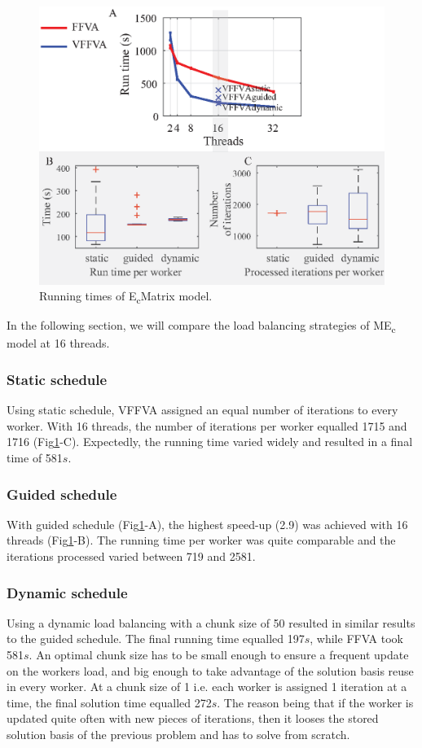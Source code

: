 \documentclass[letterpaper, 10 pt, conference]{ieeeconf}  %
\begin{document}
\begin{figure}[!htb]
\centering
\includegraphics[scale=.7]{figures/figure3/schedule.eps}
\caption{Running times of E\textsubscript{c}\textunderscore Matrix model.}
\label{fig:static.}
\end{figure}

In the following section, we will compare the load balancing strategies of ME\textsubscript{c} model at 16 threads.
\subsubsection{Static schedule}
Using static schedule, VFFVA assigned an equal number of iterations to every worker. With 16 threads, the number of iterations per worker equalled 1715 and 1716 (Fig\ref{fig:static.}-C). Expectedly, the running time varied widely and resulted in a final time of 581$s$.
\subsubsection{Guided schedule}
With guided schedule (Fig\ref{fig:static.}-A), the highest speed-up (2.9) was achieved with 16 threads (Fig\ref{fig:static.}-B). The running time per worker was quite comparable and the iterations processed varied between 719 and 2581.
\subsubsection{Dynamic schedule}
Using a dynamic load balancing with a chunk size of 50 resulted in similar results to the guided schedule. The final running time equalled 197$s$, while FFVA took 581$s$. An optimal chunk size has to be small enough to ensure a frequent update on the workers load, and big enough to take advantage of the solution basis reuse in every worker. At a chunk size of 1 i.e. each worker is assigned 1 iteration at a time, the final solution time equalled 272$s$. The reason being that if the worker is updated quite often with new pieces of iterations, then it looses the stored solution basis of the previous problem and has to solve from scratch. 
\end{document}
